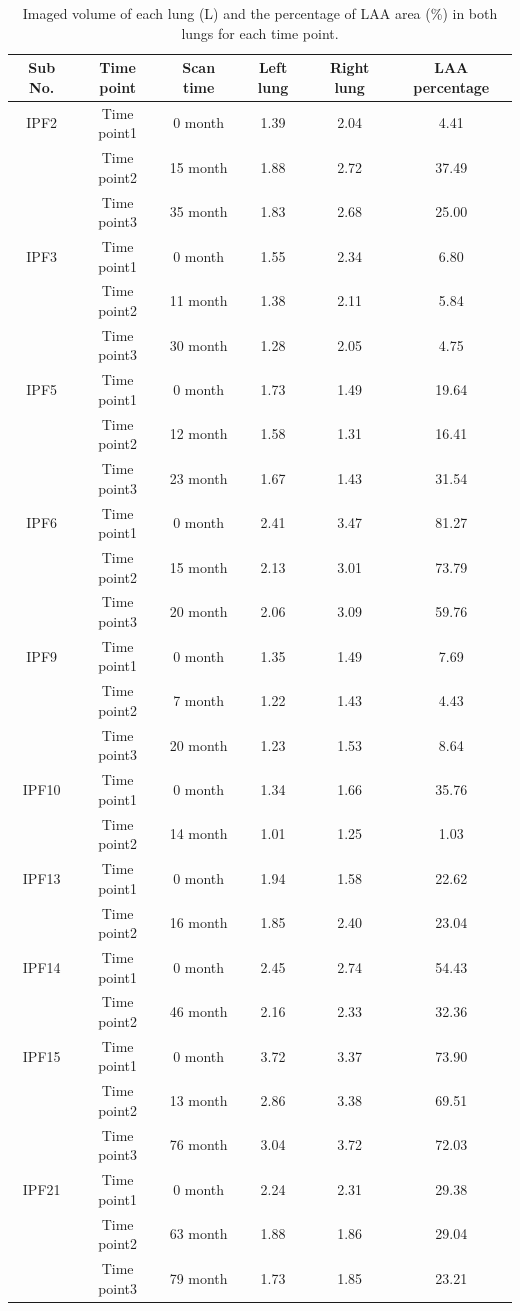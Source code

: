 \begin{table}[htbp]
\centering
\caption{Imaged volume of each lung (L) and the percentage of LAA area (\%) in both lungs for each time point.}
\label{tab:WholeVolume}
\begin{tabular}{c c c c c c}
\hline
\bf{Sub No.} & \bf{Time point} & \bf{Scan time}	& \bf{Left lung} & \bf{Right lung} & \bf{LAA percentage}\\ 
\hline
IPF2 & Time point1 &	0 month &	1.39 &	2.04 & 4.41\\
\quad & Time point2 &	15 month &	1.88 &	2.72 & 37.49\\
\quad & Time point3 &	35 month &	1.83 &	2.68 & 25.00\\
\hline
IPF3 & Time point1 &	0 month &	1.55 &	2.34 & 6.80\\
\quad & Time point2 &	11 month &	1.38 &	2.11 & 5.84\\
\quad & Time point3 &	30 month &	1.28 &	2.05 & 4.75\\
\hline
IPF5 & Time point1 &  0 month & 1.73 & 1.49 & 19.64\\
\quad & Time point2 & 12 month & 1.58 & 1.31 & 16.41\\
\quad & Time point3 & 23 month & 1.67 & 1.43 & 31.54\\
\hline
IPF6 & Time point1 &	0 month &	2.41 &	3.47 & 81.27\\
\quad & Time point2 &	15 month &	2.13 &	3.01 & 73.79\\
\quad & Time point3 &	20 month &	2.06 &	3.09 & 59.76\\
\hline
IPF9 & Time point1 &	0 month &	1.35 &	1.49 & 7.69\\
\quad & Time point2 &	7 month &	1.22 &	1.43 & 4.43\\
\quad & Time point3 &	20 month &	1.23 &	1.53 & 8.64\\
\hline
IPF10 & Time point1 &	0 month &	1.34 &	1.66 & 35.76\\
\quad & Time point2 &	14 month &	1.01 &	1.25 & 1.03\\
\hline
IPF13 & Time point1 &	0 month &	1.94 &	1.58 & 22.62\\
\quad & Time point2 &	16 month &	1.85 &	2.40 & 23.04\\
\hline
IPF14 & Time point1 &	0 month &	2.45 &	2.74 & 54.43\\
\quad & Time point2 &	46 month &	2.16 &	2.33 & 32.36\\
\hline
IPF15 & Time point1 &	0 month &	3.72 &	3.37 & 73.90\\
\quad & Time point2 &	13 month &	2.86 &	3.38 & 69.51\\
\quad & Time point3 &	76 month &	3.04 &	3.72 & 72.03\\
\hline
IPF21 & Time point1 &	0 month &	2.24 &	2.31 & 29.38\\
\quad & Time point2 &	63 month &	1.88 &	1.86 & 29.04\\
\quad & Time point3 &	79 month &	1.73 &	1.85 & 23.21\\
\hline
\end{tabular}
\end{table}

